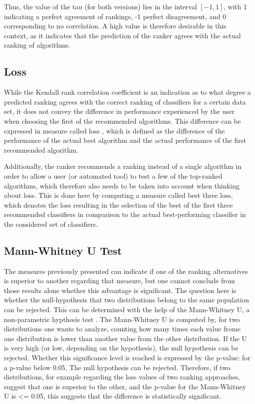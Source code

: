 Thus, the value of the tau (for both versions) lies in the interval $[-1,1]$, with 1 indicating a perfect agreement of rankings, -1 perfect disagreement, and 0 corresponding to no correlation. A high value is therefore desirable in this context, as it indicates that the prediction of the ranker agrees with the actual ranking of algorithms.

\subsection{Loss}
While the Kendall rank correlation coefficient is an indication as to what degree a predicted ranking agrees with the correct ranking of classifiers for a certain data set, it does not convey the difference in performance experienced by the user when choosing the first of the recommended algorithms. This difference can be expressed in measure called loss \cite{DBLP:conf/mldm/LeiteBV12}, which is defined as the difference of the performance of the actual best algorithm and the actual performance of the first recommended algorithm. 

Additionally, the ranker recommends a ranking instead of a single algorithm in order to allow a user (or automated tool) to test a few of the top-ranked algorithms, which therefore also needs to be taken into account when thinking about loss. This is done here by computing a measure called best three loss, which denotes the loss resulting in the selection of the best of the first three recommended classifiers in comparison to the actual best-performing classifier in the considered set of classifiers. 

\subsection{Mann-Whitney U Test}
The measures previously presented can indicate if one of the ranking alternatives is superior to another regarding that measure, but one cannot conclude from those results alone whether this advantage is significant. The question here is whether the null-hypothesis that two distributions belong to the same population can be rejected. This can be determined with the help of the Mann-Whitney U, a non-parametric hypthesis test \cite{mann1947test}. The Mann-Whitney U is computed by, for two distributions one wants to analyze, counting how many times each value frome one distribution is lower than another value from the other distribution. If the U is very high (or low, depending on the hypothesis), the null hypothesis can be rejected. Whether this significance level is reached is expressed by the p-value: for a p-value below 0.05, The null hypothesis can be rejected. Therefore, if two distributions, for example regarding the loss values of two ranking approaches, suggest that one is superior to the other, and the p-value for the Mann-Whitney U is <= 0.05, this suggests that the difference is statistically significant.
